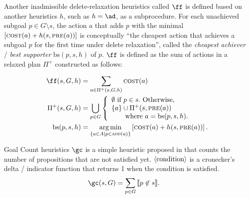 Another inadmissible delete-relaxation heuristics called
$\ff$ \cite{hoffmann01} is defined based on another heuristics $h$, such as $h=\ad$, as a subprocedure.
For each unachieved subgoal $p\in G\setminus s$,
the action $a$ that adds $p$ with the minimal $\left[\textsc{cost}(a)+h(s, \textsc{pre}(a))\right]$
is conceptually ``the cheapest action that achieves a subgoal $p$ for the first time under delete relaxation'',
called the \emph{cheapest achiever} / \emph{best supporter} $\text{bs}(p,s,h)$ of $p$.
$\ff$ is defined as the sum of actions in a relaxed plan $\Pi^+$ constructed as follows:

\begin{align}
 \ff(s,G,h) &= \sum_{a\in \Pi^+(s,G,h)} \cost(a)\\
 \Pi^+(s,G,h) &= \bigcup_{p\in G}
 \left\{
  \begin{array}{l}
   \emptyset\ \text{if}\ p\in s.\ \text{Otherwise,}\\
   \braces{a} \cup \Pi^+(s,\pre(a)) \\
   \qquad \text{where}\ a=\text{bs}(p,s,h).
  \end{array}
 \right.\\
 \text{bs}(p,s,h)&=\argmin_{\braces{a\in A\mid p\in \adde(a)}} \left[\cost(a)+h(s, \pre(a))\right].
\end{align}

Goal Count heuristics $\gc$ is a simple heuristic proposed in \cite{FikesHN72}
that counts the number of propositions that are not satisfied yet.
${\left<\text{condition}\right>}$ is a cronecker's delta / indicator function that returns 1 when the condition is satisfied.
\begin{align}
 \gc(s,G) &= \sum_{p\in G} \dbrackets{p\not \in s}.
\end{align}
